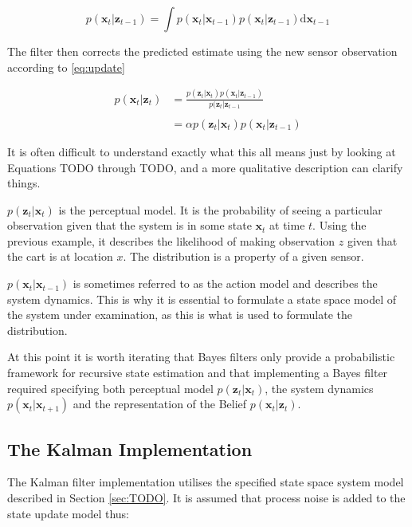 \begin{equation}\label{bayes-predict}
p(\mathbf{x}_{t} | \mathbf{z}_{t-1}) = \int{p(\mathbf{x}_{t} | \mathbf{x}_{t-1})
p(\mathbf{x}_{t} | \mathbf{z}_{t-1})\mathrm{d}\mathbf{x}_{t-1}}
\end{equation}

The filter then corrects the predicted estimate using the new sensor observation
according to \ref{eq:update}

\begin{align}\label{bayes-update}
    p(\mathbf{x}_{t} | \mathbf{z}_{t}) &=
    \frac
    {p(\mathbf{z}_{t} | \mathbf{x}_{t})p(\mathbf{x}_{t} | \mathbf{z}_{t-1})}
    {p(\mathbf{z}_{t} | \mathbf{z}_{t-1}}\\\\
    &=
    \alpha p(\mathbf{z}_{t} | \mathbf{x}_{t})p(\mathbf{x}_{t} | \mathbf{z}_{t-1})
\end{align}


It is often difficult to understand exactly what this all means just by looking at
Equations TODO through TODO, and a more qualitative description can clarify things.

$p(\mathbf{z}_{t} | \mathbf{x}_{t})$ is the perceptual model. It is the probability
of seeing a particular observation given that the system is in some state
$\mathbf{x}_{t}$ at time $t$. Using the previous example, it describes the
likelihood of making observation $z$ given that the cart is at location $x$.
The distribution is a property of a given sensor.


$p(\mathbf{x}_{t} | \mathbf{x}_{t-1})$ is sometimes referred to as the action
model and describes the system dynamics. This is why it is essential to formulate
a state space model of the system under examination, as this is what is used to
formulate the distribution.

At this point it is worth iterating that Bayes filters only provide a
probabilistic framework for recursive state estimation and that implementing
a Bayes filter required specifying both perceptual model
$p(\mathbf{z}_{t} | \mathbf{x}_{t})$, the system dynamics
$p(\mathbf{x}_{t} | \mathbf{x}_{t+1})$ and the representation of the Belief
$p(\mathbf{x}_{t} | \mathbf{z}_{t})$.

\subsection{The Kalman Implementation}
The Kalman filter implementation utilises the specified state space system
model described in Section \ref{sec:TODO}. It is assumed that process noise
is added to the state update model thus:

